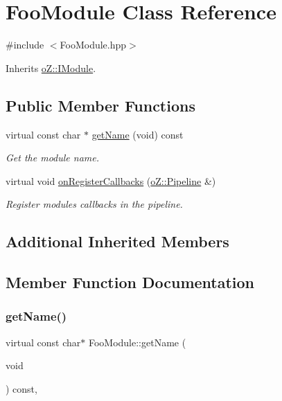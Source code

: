 \hypertarget{class_foo_module}{}\section{Foo\+Module Class Reference}
\label{class_foo_module}


{\ttfamily \#include $<$Foo\+Module.\+hpp$>$}



Inherits \mbox{\hyperlink{classo_z_1_1_i_module}{o\+Z\+::\+I\+Module}}.

\subsection*{Public Member Functions}
\begin{DoxyCompactItemize}
\item 
virtual const char $\ast$ \mbox{\hyperlink{class_foo_module_ac71d5e6de92ab9c804cc708528f052d2}{get\+Name}} (void) const
\begin{DoxyCompactList}\small\item\em Get the module name. \end{DoxyCompactList}\item 
virtual void \mbox{\hyperlink{class_foo_module_a34a4cc51ff4c493a981d61e9d9eeeb1a}{on\+Register\+Callbacks}} (\mbox{\hyperlink{classo_z_1_1_pipeline}{o\+Z\+::\+Pipeline}} \&)
\begin{DoxyCompactList}\small\item\em Register module\textquotesingle{}s callbacks in the pipeline. \end{DoxyCompactList}\end{DoxyCompactItemize}
\subsection*{Additional Inherited Members}


\subsection{Member Function Documentation}
\mbox{\label{class_foo_module_ac71d5e6de92ab9c804cc708528f052d2}} 
\subsubsection{\texorpdfstring{getName()}{getName()}}
{\footnotesize\ttfamily virtual const char$\ast$ Foo\+Module\+::get\+Name (\begin{DoxyParamCaption}\item[{void}]{ }\end{DoxyParamCaption}) const\hspace{0.3cm}{\ttfamily [inline]}, {\ttfamily [virtual]}}



